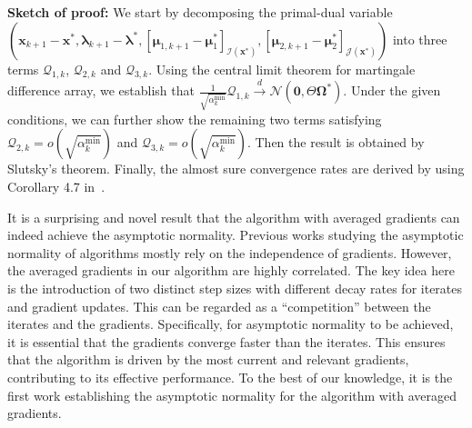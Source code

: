 \documentclass[aos]{imsart}
\numberwithin{equation}{section}
\theoremstyle{plain}
\newcommand{\michael}[1]{\textcolor{red}{Michael:\ #1}}
\newcommand{\yihang}[1]{\textcolor{blue}{Yihang:\ #1}}
\begin{document}
\textbf{Sketch of proof:} 
We start by decomposing the primal-dual variable $(\bm{x}_{k+1} - \bm{x}^{*}, \bm{\lambda}_{k+1} - \bm{\lambda}^{*}, \left[ \bm{\mu}_{1,k+1} - \bm{\mu}_{1}^{*}\right]_{\mathcal{I}(\bm{x}^{*})}, \left[ \bm{\mu}_{2,k+1} - \bm{\mu}_{2}^{*} \right]_{\mathcal{J}(\bm{x}^{*})})$ into three terms $\mathcal{Q}_{1,k}$, $\mathcal{Q}_{2,k}$ and $\mathcal{Q}_{3,k}$. 
Using the central limit theorem for martingale difference array, we establish that $\frac{1}{\sqrt{\alpha_k^{\text{min}}}} \mathcal{Q}_{1,k} \stackrel{d}{\longrightarrow} \mathcal{N} \left( \bm{0}, \Theta \bm{\Omega}^{*} \right)$. 
Under the given conditions, we can further show the remaining two terms satisfying $\mathcal{Q}_{2,k} = o\left( \sqrt{\alpha_k^{\text{min}}}\right)$ and $\mathcal{Q}_{3,k} = o\left( \sqrt{\alpha_k^{\text{min}}}\right)$. 
Then the result is obtained by Slutsky's theorem. 
Finally, the almost sure convergence rates are derived by using Corollary 4.7 in~\cite{hao2014convergence}.


It is a surprising and novel result that the algorithm with averaged gradients can indeed achieve the asymptotic normality. 
Previous works \cite{na2022asymptotic, chen2020statistical, leluc2020asymptotic, toulis2017asymptotic} studying the asymptotic normality of algorithms mostly rely on the independence of gradients.
However, the averaged gradients in our algorithm are highly correlated. 
The key idea here is the introduction of two distinct step sizes with different decay rates for iterates and gradient updates. 
This can be regarded as a ``competition'' between the iterates and the gradients. 
Specifically, for asymptotic normality to be achieved, it is essential that the gradients converge faster than the iterates. 
This ensures that the algorithm is driven by the most current and relevant gradients, contributing to its effective performance.
To the best of our knowledge, it is the first work establishing the asymptotic normality for the algorithm with averaged gradients. 

    
\end{document}
